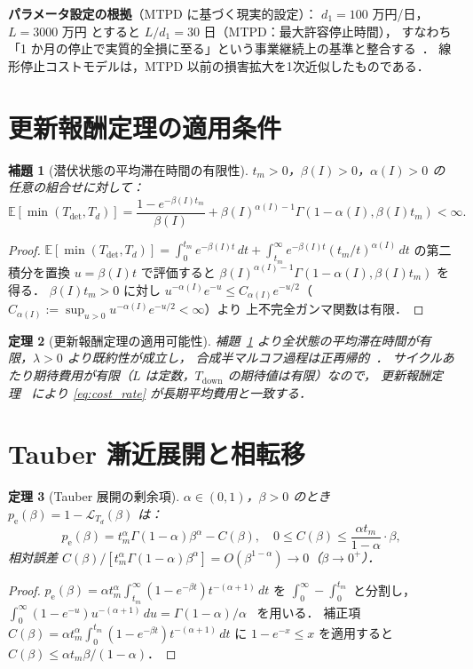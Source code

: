 \documentclass[12pt,a4paper]{article}
\theoremstyle{plain}
\newtheorem{theorem}{定理}[section]
\newtheorem{lemma}[theorem]{補題}
\theoremstyle{definition}
\theoremstyle{remark}
\newcommand{\E}{\mathbb{E}}
\newcommand{\calL}{\mathcal{L}}
\newcommand{\pe}{p_{\mathrm{e}}}
\newcommand{\Tdet}{T_{\mathrm{det}}}
\newcommand{\Tdown}{T_{\mathrm{down}}}
\newcommand{\betaI}{\beta(I)}
\newcommand{\alphI}{\alpha(I)}
\begin{document}
\textbf{パラメータ設定の根拠}（MTPD に基づく現実的設定）：
$d_1=100$ 万円/日，$L=3000$ 万円 とすると $L/d_1=30$ 日（MTPD：最大許容停止時間），
すなわち「1 か月の停止で実質的全損に至る」という事業継続上の基準と整合する~\cite{iso22301}．
線形停止コストモデルは，MTPD 以前の損害拡大を1次近似したものである．

\section{更新報酬定理の適用条件}
\label{sec:renewal}

\begin{lemma}[潜伏状態の平均滞在時間の有限性]\label{lem:sojourn}
$t_m>0$，$\betaI>0$，$\alphI>0$ の任意の組合せに対して：
\begin{equation}
\E[\min(\Tdet,T_d)]
=\frac{1-e^{-\betaI t_m}}{\betaI}
+\betaI^{\alphI-1}\Gamma(1-\alphI,\betaI t_m)<\infty.
\end{equation}
\end{lemma}
\begin{proof}
$\E[\min(\Tdet,T_d)]=\int_0^{t_m}e^{-\betaI t}\,dt+\int_{t_m}^\infty e^{-\betaI t}(t_m/t)^{\alphI}\,dt$
の第二積分を置換 $u=\betaI t$ で評価すると $\betaI^{\alphI-1}\Gamma(1-\alphI,\betaI t_m)$ を得る．
$\betaI t_m>0$ に対し $u^{-\alphI}e^{-u}\le C_{\alphI}e^{-u/2}$（$C_{\alphI}:=\sup_{u>0}u^{-\alphI}e^{-u/2}<\infty$）より
上不完全ガンマ関数は有限．
\end{proof}

\begin{theorem}[更新報酬定理の適用可能性]\label{thm:renewal}
補題~\ref{lem:sojourn} より全状態の平均滞在時間が有限，$\lambda>0$ より既約性が成立し，
合成半マルコフ過程は正再帰的~\cite{limnios2001}．
サイクルあたり期待費用が有限（$L$ は定数，$\Tdown$ の期待値は有限）なので，
更新報酬定理~\cite{ross2014} により \eqref{eq:cost_rate} が長期平均費用と一致する．
\end{theorem}

\section{Tauber 漸近展開と相転移}
\label{sec:tauberian}

\begin{theorem}[Tauber 展開の剰余項]\label{thm:remainder}
$\alpha\in(0,1)$，$\beta>0$ のとき $\pe(\beta)=1-\calL_{T_d}(\beta)$ は：
\[
\pe(\beta)=t_m^\alpha\Gamma(1-\alpha)\beta^\alpha-C(\beta),
\quad 0\le C(\beta)\le\frac{\alpha t_m}{1-\alpha}\cdot\beta,
\]
相対誤差 $C(\beta)/[t_m^\alpha\Gamma(1-\alpha)\beta^\alpha]=O(\beta^{1-\alpha})\to0$（$\beta\to0^+$）．
\end{theorem}
\begin{proof}
$\pe(\beta)=\alpha t_m^\alpha\int_{t_m}^\infty(1-e^{-\beta t})t^{-(\alpha+1)}\,dt$
を $\int_0^\infty-\int_0^{t_m}$ と分割し，
$\int_0^\infty(1-e^{-u})u^{-(\alpha+1)}\,du=\Gamma(1-\alpha)/\alpha$~\cite{feller1971} を用いる．
補正項 $C(\beta)=\alpha t_m^\alpha\int_0^{t_m}(1-e^{-\beta t})t^{-(\alpha+1)}\,dt$ に
$1-e^{-x}\le x$ を適用すると $C(\beta)\le\alpha t_m\beta/(1-\alpha)$．
\end{proof}
\end{document}
